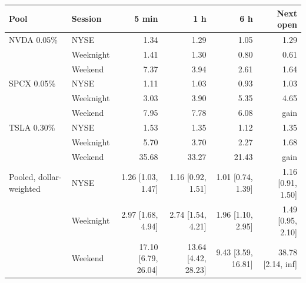 \begin{tabular}{llrrrr}
\toprule
Pool & Session & 5 min & 1 h & 6 h & Next open \\
\midrule
NVDA 0.05\% & NYSE & 1.34 & 1.29 & 1.05 & 1.29 \\
 & Weeknight & 1.41 & 1.30 & 0.80 & 0.61 \\
 & Weekend & 7.37 & 3.94 & 2.61 & 1.64 \\
\addlinespace[2pt]
SPCX 0.05\% & NYSE & 1.11 & 1.03 & 0.93 & 1.03 \\
 & Weeknight & 3.03 & 3.90 & 5.35 & 4.65 \\
 & Weekend & 7.95 & 7.78 & 6.08 & gain \\
\addlinespace[2pt]
TSLA 0.30\% & NYSE & 1.53 & 1.35 & 1.12 & 1.35 \\
 & Weeknight & 5.70 & 3.70 & 2.27 & 1.68 \\
 & Weekend & 35.68 & 33.27 & 21.43 & gain \\
\addlinespace[2pt]
Pooled, dollar-weighted & NYSE & 1.26 [1.03, 1.47] & 1.16 [0.92, 1.51] & 1.01 [0.74, 1.39] & 1.16 [0.91, 1.50] \\
 & Weeknight & 2.97 [1.68, 4.94] & 2.74 [1.54, 4.21] & 1.96 [1.10, 2.95] & 1.49 [0.95, 2.10] \\
 & Weekend & 17.10 [6.79, 26.04] & 13.64 [4.42, 28.23] & 9.43 [3.59, 16.81] & 38.78 [2.14, inf] \\
\bottomrule
\end{tabular}
